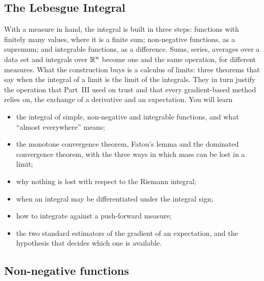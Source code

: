 \begin{notechapter}
\chapter{The Lebesgue Integral}
\label{ch:lebesgue-integral}

\begin{chapterintro}
With a measure in hand, the integral is built in three steps: functions
with finitely many values, where it is a finite sum; non-negative
functions, as a supremum; and integrable functions, as a difference.
Sums, series, averages over a data set and integrals over $\mathbb{R}^n$ become
one and the same operation, for different measures. What the
construction buys is a calculus of limits: three theorems that say when
the integral of a limit is the limit of the integrals. They in turn
justify the operation that Part~III used on trust and that every
gradient-based method relies on, the exchange of a derivative and an
expectation. You will learn
\begin{itemize}[nosep]
  \item the integral of simple, non-negative and integrable functions,
        and what ``almost everywhere'' means;
  \item the monotone convergence theorem, Fatou's lemma and the dominated
        convergence theorem, with the three ways in which mass can be
        lost in a limit;
  \item why nothing is lost with respect to the Riemann integral;
  \item when an integral may be differentiated under the integral sign;
  \item how to integrate against a push-forward measure;
  \item the two standard estimators of the gradient of an expectation,
        and the hypothesis that decides which one is available.
\end{itemize}
\end{chapterintro}

\section{Non-negative functions}\label{lebesgue-integral:sec:positive}


\end{notechapter}
